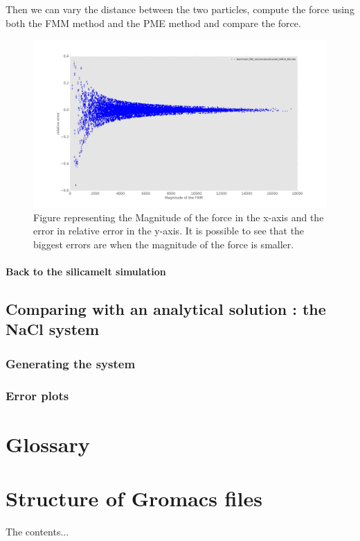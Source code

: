 \documentclass[11pt,twoside,a4paper]{report}
\begin{document}
	Then we can vary the distance between the two particles, compute the force using both the FMM method and the PME method and compare the force.
	
	
	\begin{figure}[H]
	   \includegraphics[scale=0.2]{magErr_noCorrection.jpeg}
    \centering 
    \caption{Figure representing the Magnitude of the force in the x-axis and the  error in relative error in the y-axis. It is possible to see that the biggest errors are when the magnitude of the force is smaller.}    
   \end{figure}  
	
	
	
	
\subsubsection{Back to the silicamelt simulation}

\section{Comparing with an analytical solution : the NaCl system}

\subsection{Generating the system}
\subsection{Error plots}




\nocite{*}

 

\begin{appendices}
\chapter{Glossary}
\chapter{Structure of Gromacs files}
The contents...
\end{appendices}
\end{document}
